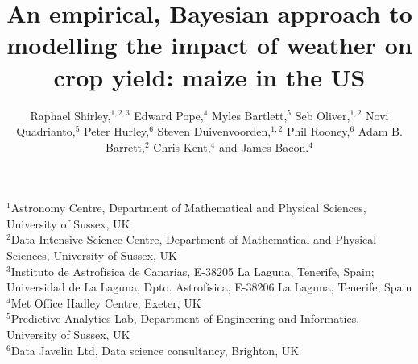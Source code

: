 \documentclass[12pt]{article}
\begin{document}
\title{An empirical, Bayesian approach to modelling the impact of weather on crop yield: maize in the US}


\author{
\parbox{\linewidth}{
Raphael Shirley,$^{1,2,3}$ %
Edward Pope,$^{4}$
Myles Bartlett,$^{5}$
Seb Oliver,$^{1,2}$
Novi Quadrianto,$^{5}$
Peter Hurley,$^{6}$
Steven Duivenvoorden,$^{1,2}$
Phil Rooney,$^{6}$
Adam B. Barrett,$^{2}$
Chris Kent,$^{4}$
and James Bacon.$^{4}$
}
}
\maketitle

\parbox{\linewidth}{
{\scriptsize
$^{1}$Astronomy Centre, Department of Mathematical and Physical Sciences, University of Sussex, UK\\
$^{2}$Data Intensive Science Centre, Department of Mathematical and Physical Sciences, University of Sussex, UK\\
$^{3}$Instituto de Astrof\'{i}sica de Canarias, E-38205 La Laguna, Tenerife, Spain;\\ Universidad de La Laguna, Dpto. Astrof\'{i}sica, E-38206 La Laguna, Tenerife, Spain\\
$^{4}$Met Office Hadley Centre, Exeter, UK\\
$^{5}$Predictive Analytics Lab, Department of Engineering and Informatics, University of Sussex, UK\\
$^{6}$Data Javelin Ltd, Data science consultancy, Brighton, UK
}
}
\end{document}
